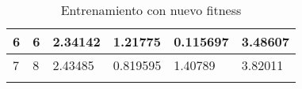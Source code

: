 \begin{table}[h!]
\begin{tabular}{llllll}
\multicolumn{1}{|l|}{6}                           & \multicolumn{1}{l|}{6}                              & \multicolumn{1}{l|}{2.34142}                     & \multicolumn{1}{l|}{1.21775}                     & \multicolumn{1}{l|}{0.115697}                    & \multicolumn{1}{l|}{3.48607}                     \\ \hline
\multicolumn{1}{|l|}{7}                           & \multicolumn{1}{l|}{8}                              & \multicolumn{1}{l|}{2.43485}                     & \multicolumn{1}{l|}{0.819595}                    & \multicolumn{1}{l|}{1.40789}                     & \multicolumn{1}{l|}{3.82011}                     \\ \hline
                                                  &                                                     &                                                  &                                                  &                                                  &                                                 
\end{tabular}
\caption{Entrenamiento con nuevo fitness}
\label{tab:nuevoFitness}
\end{table}

